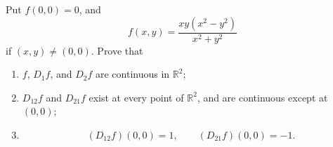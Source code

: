 	\begin{exercise}[Rudin 9.27]
		Put $f(0,0)=0$, and
		\begin{equation}
			f(x,y)=\frac{xy(x^2-y^2)}{x^2+y^2}
		\end{equation}
		if $(x,y)\neq(0,0)$. Prove that

		\begin{enumerate}[label=(\alph*)]
			\item $f$, $D_1f$, and $D_2f$ are continuous in $\mathbb{R}^2$;

			\item $D_{12}f$ and $D_{21}f$ exist at every point of $\mathbb{R}^2$, and are continuous except at $(0,0)$;

			\item
			\begin{equation}
				(D_{12}f)(0,0)=1,
				\qquad
				(D_{21}f)(0,0)=-1.
			\end{equation}
		\end{enumerate}
	\end{exercise}
